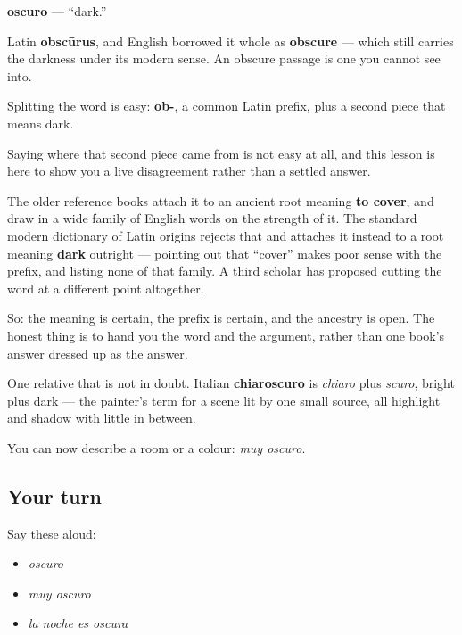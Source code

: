 \begin{cousinweb}
\textbf{oscuro} — \textquotedblleft{}dark.\textquotedblright{}

Latin \textbf{obscūrus}, and English borrowed it whole as \textbf{obscure} — which still carries the darkness under its modern sense. An obscure passage is one you cannot see into.

Splitting the word is easy: \textbf{ob-}, a common Latin prefix, plus a second piece that means dark.

Saying where that second piece came from is not easy at all, and this lesson is here to show you a live disagreement rather than a settled answer.

The older reference books attach it to an ancient root meaning \textbf{to cover}, and draw in a wide family of English words on the strength of it. The standard modern dictionary of Latin origins rejects that and attaches it instead to a root meaning \textbf{dark} outright — pointing out that \textquotedblleft{}cover\textquotedblright{} makes poor sense with the prefix, and listing none of that family. A third scholar has proposed cutting the word at a different point altogether.

So: the meaning is certain, the prefix is certain, and the ancestry is open. The honest thing is to hand you the word and the argument, rather than one book's answer dressed up as the answer.

One relative that is not in doubt. Italian \textbf{chiaroscuro} is \emph{chiaro} plus \emph{scuro}, bright plus dark — the painter's term for a scene lit by one small source, all highlight and shadow with little in between.
\end{cousinweb}

\begin{grammarlens}[title={What you've built}]
You can now describe a room or a colour: \emph{muy oscuro}.
\end{grammarlens}

\subsection*{Your turn}
Say these aloud:

\begin{itemize}
\raggedright
  \item \emph{oscuro}
  \item \emph{muy oscuro}
  \item \emph{la noche es oscura}
\end{itemize}

